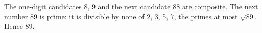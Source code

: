 The one-digit candidates 8, 9 and the next candidate 88 are composite. The next number 89 is prime: it is divisible by none of 2, 3, 5, 7, the primes at most $\sqrt{89}$. Hence $\boxed{89}$.
